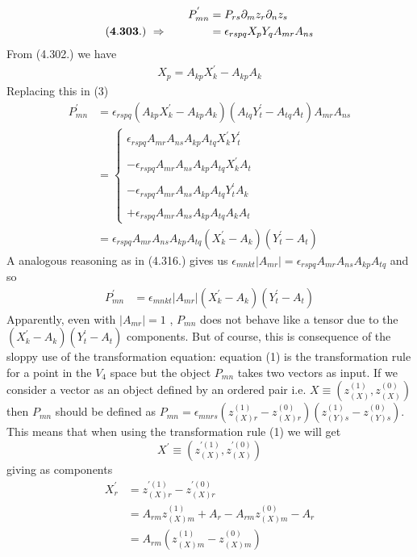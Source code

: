 \begin{align}
P^{'}_{mn}&= P_{rs}\partial_m z_r \partial_n z_s\\
\mathbf{(4.303.)\ }\Rightarrow \quad\quad\quad\quad &= \epsilon_{rspq}X_pY_q A_{mr}A_{ns}
\end{align}
From (4.302.) we have
\begin{align}
X_p = A_{kp}X^{'}_k -  A_{kp}A_k
\end{align}
Replacing this in (3)
\begin{align}
P^{'}_{mn}&=  \epsilon_{rspq}\left(A_{kp}X^{'}_k -  A_{kp}A_k\right)\left(A_{tq}Y^{'}_t -  A_{tq}A_t\right) A_{mr}A_{ns}\\
&=\left\{\begin{array}{l}
\epsilon_{rspq}A_{mr}A_{ns}A_{kp}A_{tq}X^{'}_kY^{'}_t \\\\
-\epsilon_{rspq}A_{mr}A_{ns}A_{kp}A_{tq}X^{'}_kA_t \\\\
-\epsilon_{rspq}A_{mr}A_{ns}A_{kp}A_{tq}Y^{'}_tA_k \\\\
+\epsilon_{rspq}A_{mr}A_{ns}A_{kp}A_{tq}A_kA_t 
\end{array}\right.\\
&= \epsilon_{rspq}A_{mr}A_{ns}A_{kp}A_{tq}\left(X^{'}_k-A_k\right)\left(Y^{'}_t-A_t\right)
\end{align}
A analogous reasoning as in (4.316.) gives us $\epsilon_{mnkt}\left|A_{mr}\right|=\epsilon_{rspq}A_{mr}A_{ns}A_{kp}A_{tq}$ and so 
\begin{align}
P^{'}_{mn}&= \epsilon_{mnkt}\left|A_{mr}\right| \left(X^{'}_k-A_k\right)\left(Y^{'}_t-A_t\right)
\end{align}
Apparently, even with $\left|A_{mr}\right| =1$ , $P_{mn}$ does not behave like a tensor due to the $ \left(X^{'}_k-A_k\right)\left(Y^{'}_t-A_t\right)$ components. But of course, this is consequence of the sloppy use of the transformation equation: equation (1) is the transformation rule for a point in the $V_4$ space but the object $P_{mn}$ takes two vectors as input. If we consider a vector as an object defined by an ordered pair i.e. $X\equiv \left(z^{(1)}_{(X)}, z^{(0)}_{(X)}\right)$ then $P_{mn}$ should be defined as $P_{mn}= \epsilon_{mnrs}\left(z^{(1)}_{(X)r}- z^{(0)}_{(X)r}\right)\left(z^{(1)}_{(Y)s}- z^{(0)}_{(Y)s}\right)$. This means that when using the transformation rule (1) we will get $$X^{'}\equiv \left(z^{'(1)}_{(X)}, z^{'(0)}_{(X)}\right)$$ giving as components 
\begin{align}X^{'}_r &= z^{'(1)}_{(X)r}- z^{'(0)}_{(X)r}\\&=   A_{rm}z^{(1)}_{(X)m}+A_r-A_{rm}z^{(0)}_{(X)m}-A_r\\
&= A_{rm}\left(z^{(1)}_{(X)m} -z^{(0)}_{(X)m}\right)
\end{align}
